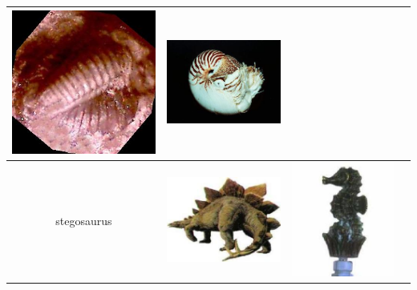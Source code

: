 \documentclass{article}
\begin{document}
\begin{table}[Ht]
\begin{tabular}{| c | c | c | c |}
\vspace{0cm}\includegraphics[scale=.1]{"Figures/False Matches/class_4_most_sure_wrong"} &
\vspace{0cm}\includegraphics[scale=.1]{"Figures/False Matches/class_4_least_sure_wrong"} \\
\hline
stegosaurus &
\vspace{0cm}\includegraphics[scale=.1]{"Figures/Best Matches/bestmatch_c5"} &
\vspace{0cm}\includegraphics[scale=.1]{"Figures/False Matches/class_5_most_sure_wrong"} &

\end{tabular}
\end{table}
\end{document}
